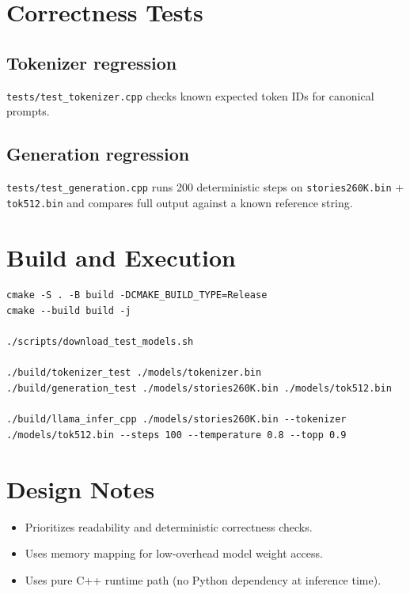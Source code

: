 \documentclass[11pt]{article}
\begin{document}
\section{Correctness Tests}
\subsection{Tokenizer regression}
\texttt{tests/test\_tokenizer.cpp} checks known expected token IDs for canonical prompts.

\subsection{Generation regression}
\texttt{tests/test\_generation.cpp} runs 200 deterministic steps on
\texttt{stories260K.bin} + \texttt{tok512.bin} and compares full output against a known reference string.

\section{Build and Execution}
\begin{lstlisting}[style=code]
cmake -S . -B build -DCMAKE_BUILD_TYPE=Release
cmake --build build -j

./scripts/download_test_models.sh

./build/tokenizer_test ./models/tokenizer.bin
./build/generation_test ./models/stories260K.bin ./models/tok512.bin

./build/llama_infer_cpp ./models/stories260K.bin --tokenizer ./models/tok512.bin --steps 100 --temperature 0.8 --topp 0.9
\end{lstlisting}

\section{Design Notes}
\begin{itemize}[leftmargin=*]
  \item Prioritizes readability and deterministic correctness checks.
  \item Uses memory mapping for low-overhead model weight access.
  \item Uses pure C++ runtime path (no Python dependency at inference time).
\end{itemize}
\end{document}
